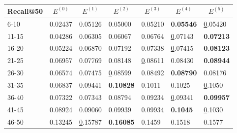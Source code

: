 \begin{table*}[]
    \begin{tabular}{|l|l|l|l|l|l|l|}
        \hline
        Recall@50 & \multicolumn{1}{c|}{$E^{(0)}$} & \multicolumn{1}{c|}{$E^{(1)}$} & \multicolumn{1}{c|}{$E^{(2)}$} & \multicolumn{1}{c|}{$E^{(3)}$} & \multicolumn{1}{c|}{$E^{(4)}$} & \multicolumn{1}{c|}{$E^{(5)}$} \\ \hline
        6-10      & 0.02437                        & 0.05126                        & 0.05000                        & 0.05210                        & \textbf{0.05546}               & {\ul 0.05420}                  \\ \hline
        11-15     & 0.04286                        & 0.06305                        & 0.06067                        & 0.06764                        & {\ul 0.07143}                  & \textbf{0.07213}               \\ \hline
        16-20     & 0.05224                        & 0.06870                        & 0.07192                        & 0.07338                        & {\ul 0.07415}                  & \textbf{0.08123}               \\ \hline
        21-25     & 0.06957                        & 0.07769                        & 0.08148                        & {\ul 0.08611}                  & 0.08430                        & \textbf{0.08944}               \\ \hline
        26-30     & 0.06574                        & 0.07475                        & {\ul 0.08599}                  & 0.08492                        & \textbf{0.08790}               & 0.08176                        \\ \hline
        31-35     & 0.06837                        & 0.09441                        & \textbf{0.10828}               & 0.1011                         & 0.1025                         & {\ul 0.1050}                   \\ \hline
        36-40     & 0.07322                        & 0.07343                        & 0.08794                        & 0.09234                        & {\ul 0.09341}                  & \textbf{0.09957}               \\ \hline
        41-45     & 0.08924                        & 0.09060                        & 0.09939                        & 0.09934                        & \textbf{0.1045}                & {\ul 0.1030}                   \\ \hline
        46-50     & 0.13245                        & {\ul 0.15787}                  & \textbf{0.16085}               & 0.1459                         & 0.1518                         & 0.1577                         \\ \hline

\end{tabular}
\end{table*}
